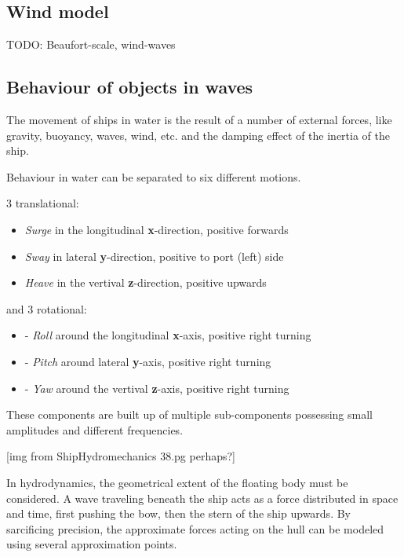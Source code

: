 \subsection{Wind model}

TODO: Beaufort-scale, wind-waves

\subsection{Behaviour of objects in waves}

The movement of ships in water is the result of a number of external forces, like gravity, buoyancy, waves, wind, etc. and the damping effect of the inertia of the ship.

Behaviour in water can be separated to six different motions.

3 translational:

\begin{itemize}

	\item \emph{Surge} in the longitudinal \textbf{x}-direction, positive forwards
	\item \emph{Sway} in lateral \textbf{y}-direction, positive to port (left) side
	\item \emph{Heave} in the vertival \textbf{z}-direction, positive upwards

\end{itemize}

and 3 rotational:

\begin{itemize}

	\item \Phi - \emph{Roll} around the longitudinal \textbf{x}-axis, positive right turning
	\item \Theta - \emph{Pitch} around lateral \textbf{y}-axis, positive right turning
	\item \Psi - \emph{Yaw} around the vertival \textbf{z}-axis, positive right turning

\end{itemize}

These components are built up of multiple sub-components possessing small amplitudes and different frequencies.

[img from ShipHydromechanics 38.pg perhaps?]

In hydrodynamics, the geometrical extent of the floating body must be considered. A wave traveling beneath the ship acts as a force distributed in space and time, first pushing the bow, then the stern of the ship upwards. By sarcificing precision, the approximate forces acting on the hull can be modeled using several approximation points.

